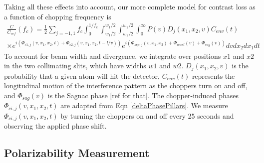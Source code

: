 \documentclass[12pt,letterpaper]{article}
\newcommand{\eqnref}[1]{Eqn \ref{#1}}
\begin{document}
Taking all these effects into account, our more complete model for contrast loss as a function of chopping frequency is
\begin{align}
	\frac{C}{C_{ref}}(f_c) = 
		\frac{1}{2} \sum_{j=-1,1}
		f_c \int_0^{1/f_c} 
		\int_{w_{1}/2}^{w_{1}/2}
		\int_{w_{2}/2}^{w_{2}/2}
		\int_0^{\infty} 
		P(v)
		D_j(x_1, x_2, v)
		C_{env}(t)                   
		\nonumber \\ \times
		e^{i( \Phi_{c1,j}(v,x_1,x_2,t) + \Phi_{c2,j}(v,x_1,x_2,t-l/v) )}
		e^{i( \Phi_{sep,j}(v,x_1,x_2) + \Phi_{accel}(v) + \Phi_{sag}(v) )}
		dv dx_{2} dx_{1} dt	
	\label{CvCF}
\end{align}
To account for beam width and divergence, we integrate over positions $x1$ and $x2$ in the two collimating slits, which have widths $w1$ and $w2$. $D_j(x_1, x_2, v)$ is the probability that a given atom will hit the detector, $C_{env}(t)$ represents the longitudinal motion of the interference pattern as the choppers turn on and off, and $\Phi_{sag}(v)$ is the Sagnac phase [ref for that]. The chopper-induced phases $\Phi_{ci,j}(v,x_1,x_2,t)$ are adapted from \eqnref{deltaPhasePillars}. %
We measure $\Phi_{ci,j}(v,x_1,x_2,t)$ by turning the choppers on and off every 25 seconds and observing the applied phase shift.

\begin{comment}
\begin{align}
	\Phi_{ci,j} = \frac{K}{v}
	\left[
		\frac{1}{b^2-(
			x_{ci} \pm (x_2-x_1)\frac{z_{2ci}}{z_{12}} \pm x_2 
			)^2}
		-
		\frac{1}{b^2-(
			)^2}
	\right]
	\label{phiCij}
\end{align}
\end{comment}

\subsection{Polarizability Measurement}
\end{document}
